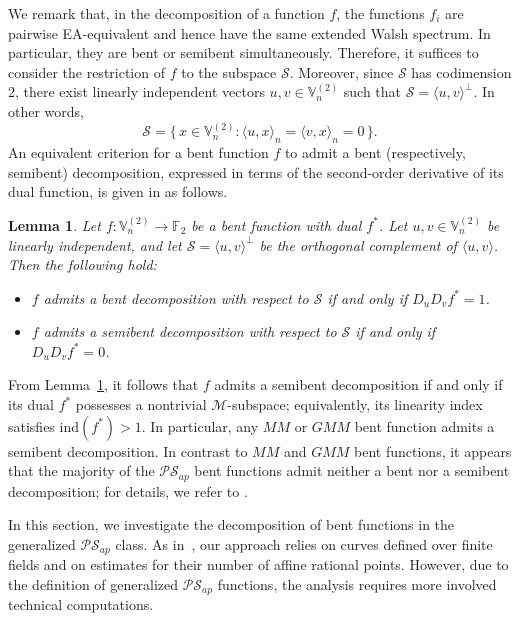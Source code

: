 \documentclass[12pt]{article}
\theoremstyle{plain}
\newtheorem{lemma}{Lemma}
\theoremstyle{definition}
\newcommand{\F}{\mathbb{F}}
\newcommand{\V}{\mathbb{V}}
\renewcommand{\to}{\rightarrow}
\begin{document}
	We remark that, in the decomposition of a function $f$, the
	functions $f_i$ are pairwise EA-equivalent and hence have
	the same extended Walsh spectrum. In particular, they are bent or semibent
	simultaneously. Therefore, it suffices to consider the restriction of
	$f$ to the subspace $\mathcal{S}$.
	Moreover, since $\mathcal S$ has codimension $2$, there exist linearly independent vectors 
	$u,v \in \V_n^{(2)}$ such that $\mathcal S = \langle u,v\rangle^\perp$.
	In other words,
	\[
	\mathcal S
	=
	\{\, x \in \V_n^{(2)} : \langle u,x\rangle_n = \langle v,x\rangle_n = 0 \,\}.
	\]
	An equivalent criterion for a bent function $f$ to admit a bent
	(respectively, semibent) decomposition, expressed in terms of the
	second-order derivative of its dual function, is given in
	\cite[Theorem~7]{CaCha} as follows.
	
	\begin{lemma}
		\label{lem:decom}
		Let $f \colon \V_n^{(2)} \to \F_2$ be a bent function with dual $f^*$.
		Let $u,v \in \V_n^{(2)}$ be linearly independent, and let $\mathcal{S} = \langle u,v \rangle^\perp$
		be the orthogonal complement of $\langle u,v \rangle$.
		Then the following hold:
		\begin{itemize}
			\item[(i)] $f$ admits a bent decomposition with respect to $\mathcal{S}$
			if and only if $D_u D_v f^* = 1$.
			\item[(ii)] $f$ admits a semibent decomposition with respect to $\mathcal{S}$
			if and only if $D_u D_v f^* = 0$.
		\end{itemize}
	\end{lemma}
	
	From Lemma~\ref{lem:decom}, it follows that $f$ admits a semibent
	decomposition if and only if its dual $f^*$ possesses a nontrivial
	$\mathcal{M}$-subspace; equivalently, its linearity index satisfies
	$\mathrm{ind}(f^*) > 1$. In particular, any $MM$ or $GMM$ bent function
	admits a semibent decomposition. In contrast to $MM$ and $GMM$ bent
	functions, it appears that the majority of the $\mathcal{PS}_{ap}$ bent
	functions admit neither a bent nor a semibent decomposition; for
	details, we refer to \cite{akkmpp26}.
	
	In this section, we investigate the decomposition of bent functions in the
	generalized $\mathcal{PS}_{ap}$ class. 
	As in~\cite{akkmpp26}, our approach relies on curves defined over finite fields 
	and on estimates for their number of affine rational points. 
	However, due to the definition of generalized $\mathcal{PS}_{ap}$ functions, 
	the analysis requires more involved technical computations.
	
\end{document}
